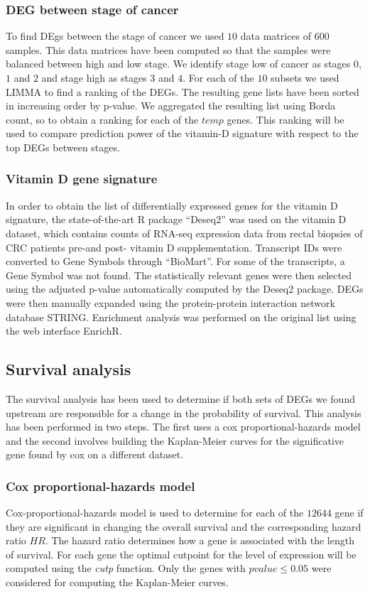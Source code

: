\documentclass[fleqn,10pt]{SelfArx} %
\begin{document}
		\subsubsection{DEG between stage of cancer}
			To find DEgs between the stage of cancer we used $10$ data matrices of $600$ samples.
			This data matrices have been computed so that the samples were balanced between high and low stage.
			We identify stage low of cancer as stages $0$, $1$ and $2$ and stage high as stages $3$ and $4$.
			For each of the $10$ subsets we used LIMMA to find a ranking of the DEGs.
			The resulting gene lists have been sorted in increasing order by p-value.
			We aggregated the resulting list using Borda count, so to obtain a ranking for each of the $temp$ genes.
			This ranking will be used to compare prediction power of the vitamin-D signature with respect to the top DEGs between stages.

		\subsubsection{Vitamin D gene signature}
			In order to obtain the list of differentially expressed genes for the vitamin D signature, the state-of-the-art R package “Deseq2” was used on the vitamin D dataset, which contains counts of RNA-seq expression data from rectal biopsies of CRC patients pre-and post- vitamin D supplementation. Transcript IDs were converted to Gene Symbols through “BioMart”. For some of the transcripts, a Gene Symbol was not found. The statistically relevant genes were then selected using the adjusted p-value automatically computed by the Deseq2 package. DEGs were then manually expanded using the protein-protein interaction network database STRING.
			Enrichment analysis was performed on the original list using the web interface EnrichR.


	\subsection{Survival analysis}
		The survival analysis has been used to determine if both sets of DEGs we found upstream are responsible for a change in the probability of survival.
		This analysis has been performed in two steps.
		The first uses a cox proportional-hazards model and the second involves building the Kaplan-Meier curves for the significative gene found by cox on a different dataset.

		\subsubsection{Cox proportional-hazards model}
			Cox-proportional-hazards model is used to determine for each of the $12644$ gene if they are significant in changing the overall survival and the corresponding hazard ratio $HR$.
			The hazard ratio determines how a gene is associated with the length of survival.
			For each gene the optimal cutpoint for the level of expression will be computed using the \emph{cutp} function.
			Only the genes with $pvalue \le 0.05$ were considered for computing the Kaplan-Meier curves.
\end{document}
